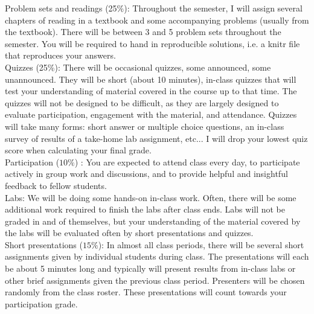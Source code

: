 \documentclass[10pt]{article}
\begin{document}
\noindent Problem sets and readings (25\%): Throughout the semester, I will assign several chapters of reading in a textbook and some accompanying problems (usually from the textbook). There will be between 3 and 5 problem sets throughout the semester. You will be required to hand in reproducible solutions, i.e. a knitr file that reproduces your answers. \\

\noindent Quizzes (25\%): There will be occasional quizzes, some announced, some unannounced. They will be short (about 10 minutes), in-class quizzes that will test your understanding of material covered in the course up to that time. The quizzes will not be designed to be difficult, as they are largely designed to evaluate participation, engagement with the material, and attendance. Quizzes will take many forms: short answer or multiple choice questions, an in-class survey of results of a take-home lab assignment, etc... I will drop your lowest quiz score when calculating your final grade.  \\


\noindent Participation  	($10\%$) :
You are expected to attend class every day, to participate actively in group work and discussions, and to provide helpful and insightful feedback to fellow students.\\

\noindent Labs: We will be doing some hands-on in-class work. Often, there will be some additional work required to finish the labs after class ends. Labs will not be graded in and of themselves, but your understanding of the material covered by the labs will be evaluated often by short presentations and quizzes. \\

\noindent Short presentations ($15\%$): In almost all class periods, there will be several short assignments given by individual students during class. The presentations will each be about 5 minutes long and typically will present results from in-class labs or other brief assignments given the previous class period. Presenters will be chosen randomly from the class roster. These presentations will count towards your participation grade. \\
\end{document}
